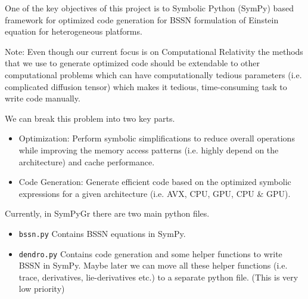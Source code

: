 One of the key objectives of this project is to Symbolic Python (SymPy) based framework for optimized code generation for BSSN formulation of Einstein equation for heterogeneous platforms.

Note: Even though our current focus is on Computational Relativity the methods that we use to generate optimized code should be extendable to other computational problems which can have computationally tedious parameters (i.e. complicated diffusion tensor) which makes it tedious, time-consuming task to write code manually.  

We can break this problem into two key parts. 
\begin{itemize}
\item Optimization:  Perform symbolic simplifications to reduce overall operations while improving the memory access patterns (i.e. highly depend on the architecture) and cache performance. 
\item Code Generation: Generate efficient code based on the optimized symbolic expressions for a given architecture (i.e. AVX, CPU, GPU, CPU \& GPU). 
\end{itemize}

Currently, in SymPyGr there are two main python files. 
\begin{itemize}
\item \texttt{bssn.py} Contains BSSN equations in SymPy.
\item \texttt{dendro.py} Contains code generation and some helper functions to write BSSN in SymPy.  Maybe later we can move all these helper functions (i.e. trace, derivatives, lie-derivatives etc.) to a separate python file. (This is very low priority)
\end{itemize}